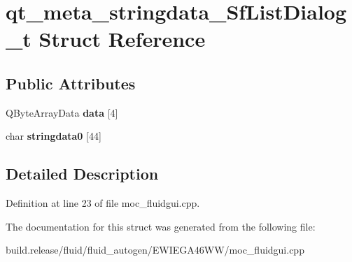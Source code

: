 \hypertarget{structqt__meta__stringdata___sf_list_dialog__t}{}\section{qt\+\_\+meta\+\_\+stringdata\+\_\+\+Sf\+List\+Dialog\+\_\+t Struct Reference}
\label{structqt__meta__stringdata___sf_list_dialog__t}
\subsection*{Public Attributes}
\begin{DoxyCompactItemize}
\item 
\mbox{\label{structqt__meta__stringdata___sf_list_dialog__t_a219e277582d549cd8286ee3d3f24d2fc}} 
Q\+Byte\+Array\+Data {\bfseries data} \mbox{[}4\mbox{]}
\item 
\mbox{\label{structqt__meta__stringdata___sf_list_dialog__t_aeae82f5b02e6e4cd4f341555fa3dffd0}} 
char {\bfseries stringdata0} \mbox{[}44\mbox{]}
\end{DoxyCompactItemize}


\subsection{Detailed Description}


Definition at line 23 of file moc\+\_\+fluidgui.\+cpp.



The documentation for this struct was generated from the following file\+:\begin{DoxyCompactItemize}
\item 
build.\+release/fluid/fluid\+\_\+autogen/\+E\+W\+I\+E\+G\+A46\+W\+W/moc\+\_\+fluidgui.\+cpp\end{DoxyCompactItemize}

